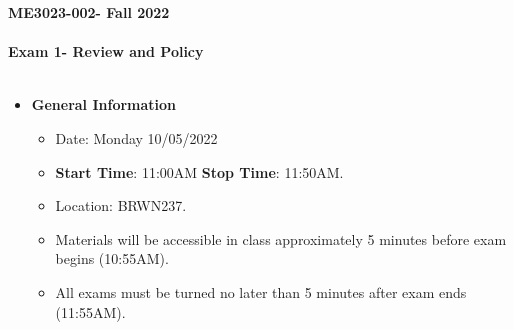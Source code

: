 \documentclass[11pt]{article}
\newcommand{\EXAMNUM}{1\hspace{0mm}}
\newcommand{\SECNUM}{002\hspace{0mm}}
\begin{document}
\textbf{ \LARGE ME3023-\SECNUM - Fall 2022} \\\\
\textbf{ \LARGE \hspace*{5mm} Exam \EXAMNUM \hspace{2mm}- Review and Policy } \\\\

\begin{itemize}
	\item  \textbf{\Large General Information}

	\begin{itemize}

		\item Date: Monday 10/05/2022
		\item {\bf Start Time}: 11:00AM {\bf Stop Time}: 11:50AM.
		\item Location: BRWN237. 
		 
		\item Materials will be accessible in class approximately 5 minutes before exam begins (10:55AM).
		\item All exams must be turned no later than 5 minutes after exam ends (11:55AM). \vspace{1mm}\\
		
	\end{itemize}


\end{itemize}
\end{document}

